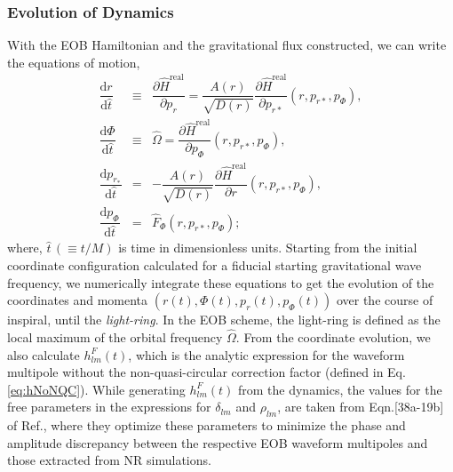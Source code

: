\documentclass[aps,
prd,
amsmath,
amssymb,
twocolumn,
floatfix,
groupedaddress]{revtex4-1}
\newcommand{\D}{\mathrm{d}}
\newcommand{\real}{\mathrm{real}}
\begin{document}
\subsubsection{Evolution of Dynamics}\label{sec:level3:DynamicalEvolution}
With the EOB Hamiltonian and the gravitational flux constructed, we can write the equations of motion,
\begin{eqnarray}
\dfrac{\D r}{\D\hat{t}} &\equiv & \dfrac{\partial \hat{H}^{\real}}{\partial p_r} = \dfrac{A(r)}{\sqrt{D(r)}}\dfrac{\partial \hat{H}^{\real}}{\partial p_{r*}} (r, p_{r*}, p_{\Phi}) ,\\
\dfrac{\D\Phi}{\D\hat{t}} &\equiv & \hat{\Omega} = \dfrac{\partial \hat{H}^{\real}}{\partial p_{\Phi}} (r, p_{r*}, p_{\Phi}) , \\ 
\dfrac{\D p_{r_*}}{\D\hat{t}} &=& -\dfrac{A(r)}{\sqrt{D(r)}} \dfrac{\partial \hat{H}^{\real}}{\partial r} (r, p_{r*}, p_{\Phi}) ,\\
\dfrac{\D p_{\Phi}}{\D\hat{t}} &=& \hat{F}_{\Phi}(r, p_{r*}, p_{\Phi}) ;
\end{eqnarray}
where, $\hat{t}\,(\equiv t/M)$ is time in dimensionless units. Starting from the initial coordinate configuration calculated for a fiducial starting gravitational wave frequency, we numerically integrate these equations to get the evolution of the coordinates and momenta $(r(t),\Phi(t),p_r(t),p_{\Phi}(t))$ over the course of inspiral, until the \emph{light-ring}. In the EOB scheme, the light-ring is defined as the local maximum of the orbital frequency $\hat{\Omega}$. From the coordinate evolution, we also calculate $h^F_{lm}(t)$, which is the analytic expression for the waveform multipole without the non-quasi-circular correction factor (defined in Eq.\ref{eq:hNoNQC}). While generating $h^F_{lm}(t)$ from the dynamics, the values for the free parameters in the expressions for $\delta_{lm}$ and $\rho_{lm}$, are taken from Eqn.[38a-19b] of Ref.\citep{BuonannoEOBv2Main}, where they optimize these parameters to minimize the phase and amplitude discrepancy between the respective EOB waveform multipoles and those extracted from NR simulations.
\end{document}
